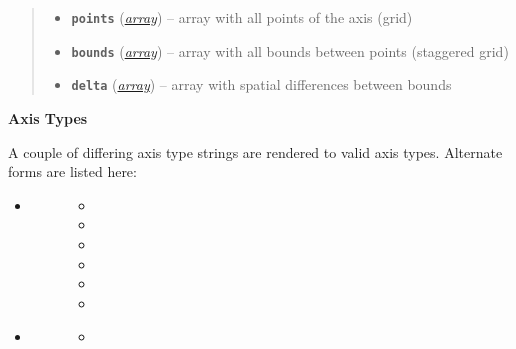 \documentclass[a4paper,10pt,english]{sphinxmanual}
\begin{document}
\begin{fulllineitems}
\begin{quote}
\begin{description}
\begin{itemize}
\item {} 
\textbf{\texttt{points}} (\href{http://docs.python.org/2.7/library/array.html\#module-array}{\emph{array}}) -- array with all points of the axis (grid)

\item {} 
\textbf{\texttt{bounds}} (\href{http://docs.python.org/2.7/library/array.html\#module-array}{\emph{array}}) -- array with all bounds between points (staggered grid)

\item {} 
\textbf{\texttt{delta}} (\href{http://docs.python.org/2.7/library/array.html\#module-array}{\emph{array}}) -- array with spatial differences between bounds

\end{itemize}

\end{description}\end{quote}

\textbf{Axis Types}

A couple of differing axis type strings are rendered to valid axis types.
Alternate forms are listed here:
\begin{itemize}
\item {} \begin{description}
\item[{}] \leavevmode\begin{itemize}
\item {} 

\item {} 

\item {} 

\item {} 

\item {} 

\item {} 

\end{itemize}

\end{description}

\item {} \begin{description}
\item[{}] \leavevmode\begin{itemize}
\item {} 


\end{itemize}
\end{description}
\end{itemize}
\end{fulllineitems}
\end{document}
